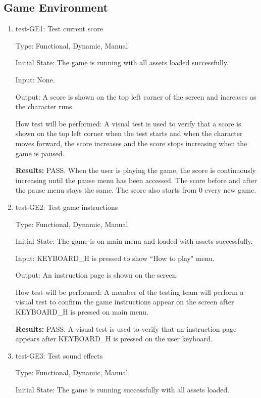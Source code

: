 \documentclass[12pt, titlepage]{article}
\begin{document}
\subsection{Game Environment}
\begin{enumerate}
\item{test-GE1: Test current score\\}

Type: Functional, Dynamic, Manual
					
Initial State: The game is running with all assets loaded successfully.
					
Input: None.
					
Output: A score is shown on the top left corner of the screen and increases as the character runs.
					
How test will be performed: A visual test is used to verify that a score is shown on the top left corner when the test starts and when the character moves forward, the score increases and the score stops increasing when the game is paused.

\textbf{Results:} PASS. When the user is playing the game, the score is continuously increasing until the pause menu has been accessed. The score before and after the pause menu stays the same. The score also starts from 0 every new game.

\item{test-GE2: Test game instructions\\}

Type: Functional, Dynamic, Manual
					
Initial State: The game is on main menu and loaded with assets successfully. 
					
Input: KEYBOARD\_H is pressed to show ``How to play" menu.
					
Output: An instruction page is shown on the screen.
					
How test will be performed: A member of the testing team will perform a visual test to confirm the game instructions appear on the screen after KEYBOARD\_H is pressed on main menu.

\textbf{Results: }PASS. A visual test is used to verify that an instruction page appears after KEYBOARD\_H is pressed on the user keyboard.

\item{test-GE3: Test sound effects\\}

Type: Functional, Dynamic, Manual
					
Initial State: The game is running successfully with all assets loaded.
					

\end{enumerate}
\end{document}
